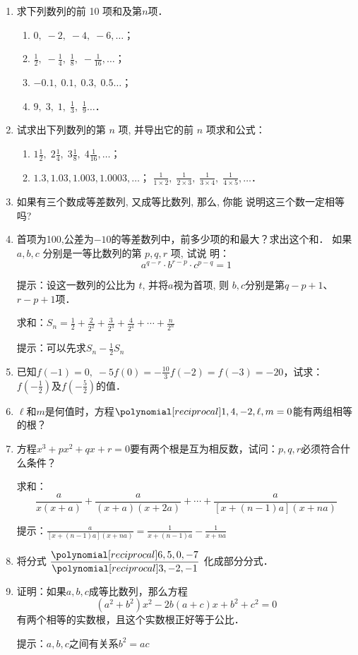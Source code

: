 \begin{enumerate}
    \item 求下列数列的前 10 项和及第$n$项．
\begin{enumerate}
    \item $0,\;-2,\;-4,\;-6, \ldots$；
    \item $\frac{1}{2},\;-\frac{1}{4},\; \frac{1}{8},\;-\frac{1}{16}, \ldots$；
    \item $-0.1,\;0.1,\;0.3,\;0.5 \ldots$；
    \item $9,\;3,\;1,\; \frac{1}{3},\; \frac{1}{9} \ldots$．
\end{enumerate}

\item 试求出下列数列的第 $n$ 项, 并导出它的前 $n$ 项求和公式：
\begin{enumerate}
    \item $1 \frac{1}{2},\; 2 \frac{1}{4}, \;3 \frac{1}{8} ,\; 4 \frac{1}{16}, \ldots$；
    \item $ 1.3,1.03,1.003,1.0003, \ldots$；
    \staritem $\frac{1}{1 \times 2},\; \frac{1}{2 \times 3},\; \frac{1}{3 \times 4},\; \frac{1}{4 \times 5},\ldots$．
\end{enumerate}

\item 如果有三个数成等差数列, 又成等比数列, 那么, 你能
    说明这三个数一定相等吗?
    \item 首项为100,公差为$-10$的等差数列中，前多少项的和最大？求出这个和．
\staritem  如果 $a, b, c$ 分别是一等比数列的第 $p, q, r$ 项, 试说
    明：
    $$a^{q-r} \cdot b^{r-p} \cdot c^{p-q}=1$$
    
    提示：设这一数列的公比为 $t$, 并将$a$视为首项, 则 $b, c$分别是第$q-p+1$、$r-p+1$项．

\staritem 求和：$S_n=\frac{1}{2}+\frac{2}{2^2}+\frac{3}{2^3}+\frac{4}{2^4}+\cdots+\frac{n}{2^n}$

提示：可以先求$S_n-\frac{1}{2}S_n$


\item 已知$f(-1)=0,\; -5f(0)=-\frac{10}{3}f(-2)=f(-3)=-20$，试求：$f\left(-\frac{1}{2}\right)$及$f\left(-\frac{5}{2}\right)$的值．

\item $\ell$和$m$是何值时，方程$\poly{1,4,-2,\ell ,m}=0$能有两组相等的根？
\item 方程$x^3+px^2+qx+r=0$要有两个根是互为相反数，试问：$p,q,r$必须符合什么条件？

\staritem 求和：
\[\frac{a}{x(x+a)}+\frac{a}{(x+a)(x+2a)}+\cdots +\frac{a}{[x+(n-1)a](x+na)}\]

提示：$\frac{a}{[x+(n-1)a](x+na)}=\frac{1}{x+(n-1)a}-\frac{1}{x+na}$

\item 将分式 $\frac{\poly{6,5,0,-7}}{\poly{3,-2,-1}}$ 化成部分分式．

\item 证明：如果$a,b,c$成等比数列，那么方程
\[(a^2+b^2)x^2-2b(a+c)x+b^2+c^2=0\]
有两个相等的实数根，且这个实数根正好等于公比．

提示：$a,b,c$之间有关系$b^2=ac$

\end{enumerate}